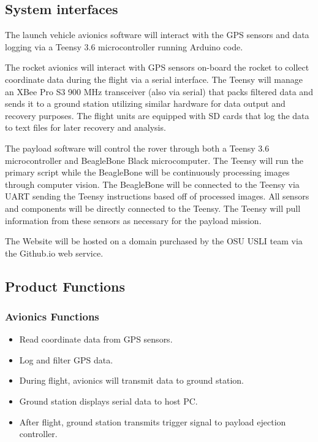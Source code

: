 \documentclass[onecolumn, draftclsnofoot, 10pt, compsoc]{IEEEtran}
\begin{document}
\subsection{System interfaces}
The launch vehicle avionics software will interact with the GPS sensors and data logging via a Teensy 3.6 microcontroller running Arduino code. 
\vspace{.5cm}

\noindent The rocket avionics will interact with GPS sensors on-board the rocket to collect coordinate data during the flight via a serial interface. The Teensy will manage an XBee Pro S3 900 MHz transceiver (also via serial) that packs filtered data and sends it to a ground station utilizing similar hardware for data output and recovery purposes. The flight units are equipped with SD cards that log the data to text files for later recovery and analysis.
\vspace{.5cm}

\noindent The payload software will control the rover through both a Teensy 3.6 microcontroller and BeagleBone Black microcomputer. The Teensy will run the primary script while the BeagleBone will be continuously processing images through computer vision. The BeagleBone will be connected to the Teensy via UART sending the Teensy instructions based off of processed images. All sensors and components will be directly connected to the Teensy. The Teensy will pull information from these sensors as necessary for the payload mission. 
\vspace{.5cm}

\noindent The Website will be hosted on a domain purchased by the OSU USLI team via the Github.io web service.



\subsection{Product Functions}
\subsubsection{Avionics Functions} \begin{itemize}
\item Read coordinate data from GPS sensors.
\item Log and filter GPS data.
\item During flight, avionics will transmit data to ground station. 
\item Ground station displays serial data to host PC.
\item After flight, ground station transmits trigger signal to payload ejection controller.\\
\end{itemize}
\end{document}
